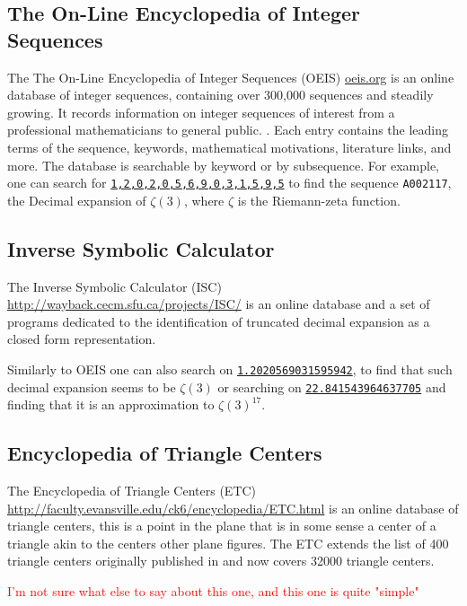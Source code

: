 \documentclass{article}
\newcommand{\todo}[1]{\textcolor{red}{#1}}
\begin{document}
\subsection{The On-Line Encyclopedia of Integer Sequences}
The The On-Line Encyclopedia of Integer Sequences (OEIS) \url{oeis.org} is an online database of integer sequences, containing over 300,000 sequences and steadily growing.
It records information on integer sequences of interest from a professional mathematicians to general public.
.
Each entry contains the leading terms of the sequence, keywords, mathematical motivations, literature links, and more.
The database is searchable by keyword or by subsequence.
For example, one can search for \href{https://oeis.org/search?q=1,2,0,2,0,5,6,9,0,3,1,5,9,5}{\texttt{1,2,0,2,0,5,6,9,0,3,1,5,9,5}}
to find the sequence \texttt{A002117}, the Decimal expansion of $\zeta(3)$, where $\zeta$ is the Riemann-zeta function.

\subsection{Inverse Symbolic Calculator}
The Inverse Symbolic Calculator (ISC) \url{http://wayback.cecm.sfu.ca/projects/ISC/} is an online database and a set of programs dedicated to the identification of truncated decimal expansion as a closed form representation.

Similarly to OEIS one can also search on \href{http://wayback.cecm.sfu.ca/cgi-bin/isc/lookup?number=1.2020569031595942&lookup_type=simple}{\texttt{1.2020569031595942}}, to find that such decimal expansion seems to be $\zeta(3)$ or
searching on
\href{http://wayback.cecm.sfu.ca/cgi-bin/isc/lookup?number=22.8415439646377&lookup_type=simple}{\texttt{22.841543964637705}} and finding that it is an approximation to $\zeta(3)^{17}$.


\subsection{Encyclopedia of Triangle Centers}

The Encyclopedia of Triangle Centers (ETC) \url{http://faculty.evansville.edu/ck6/encyclopedia/ETC.html} is an online database of triangle centers, this is a point in the plane that is in some sense a center of a triangle akin to the centers other plane figures.
The ETC extends the list of 400 triangle centers originally published in \cite{kimberling-98} and now covers 32000 triangle centers.

\todo{I'm not sure what else to say about this one, and this one is quite "simple"}
\end{document}
